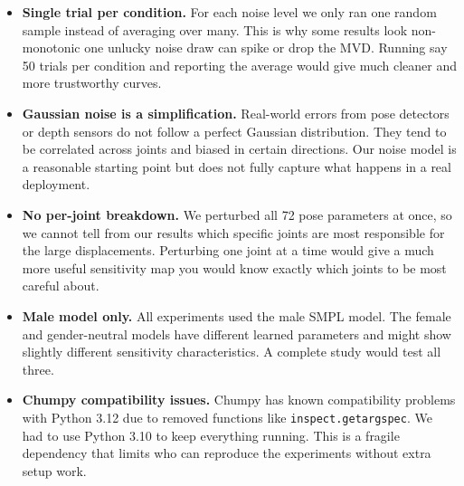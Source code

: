 \documentclass[final]{article}
\begin{document}
\begin{itemize}

    \item \textbf{Single trial per condition.} For each noise level we only ran one random sample instead of averaging over many. This is why some results look non-monotonic one unlucky noise draw can spike or drop the MVD. Running say 50 trials per condition and reporting the average would give much cleaner and more trustworthy curves.

    \item \textbf{Gaussian noise is a simplification.} Real-world errors from pose detectors or depth sensors do not follow a perfect Gaussian distribution. They tend to be correlated across joints and biased in certain directions. Our noise model is a reasonable starting point but does not fully capture what happens in a real deployment.

    \item \textbf{No per-joint breakdown.} We perturbed all 72 pose parameters at once, so we cannot tell from our results which specific joints are most responsible for the large displacements. Perturbing one joint at a time would give a much more useful sensitivity map you would know exactly which joints to be most careful about.


    \item \textbf{Male model only.} All experiments used the male SMPL model. The female and gender-neutral models have different learned parameters and might show slightly different sensitivity characteristics. A complete study would test all three.

    \item \textbf{Chumpy compatibility issues.} Chumpy has known compatibility problems with Python 3.12 due to removed functions like \texttt{inspect.getargspec}. We had to use Python 3.10 to keep everything running. This is a fragile dependency that limits who can reproduce the experiments without extra setup work.

\end{itemize}
\end{document}
